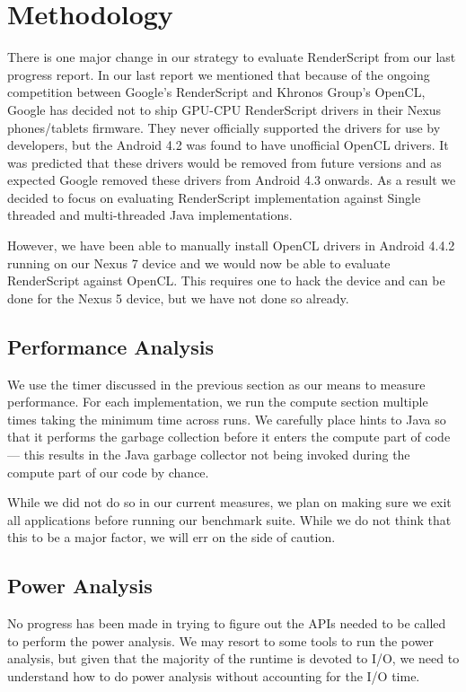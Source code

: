 \section{Methodology}

There is one major change in our strategy to evaluate RenderScript from our last
progress report. In our last report we mentioned that because of the ongoing competition between
Google's RenderScript and Khronos Group's OpenCL, Google has decided not to ship
GPU-CPU RenderScript drivers in their Nexus phones/tablets firmware. They never
officially supported the drivers for use by developers, but the Android 4.2 was
found to have unofficial OpenCL drivers. It was predicted that these drivers
would be removed from future versions and as expected Google removed these drivers from
Android 4.3 onwards. As a result we decided to focus on evaluating RenderScript
implementation against Single threaded and multi-threaded Java implementations. 

However, we have been able to manually install OpenCL drivers in Android 4.4.2
running on our Nexus 7 device and we would now be able to evaluate
RenderScript against OpenCL.
This requires one to hack the device and can be done for the Nexus 5 device, but
  we have not done so already.


\subsection{Performance Analysis}

We use the timer discussed in the previous section as our means to measure performance.
For each implementation, we run the compute section multiple times taking the 
  minimum time across runs.
We carefully place hints to Java so that it performs the garbage collection before
  it enters the compute part of code --- this results in the Java garbage collector not being invoked during the compute part of our code by chance.

While we did not do so in our current measures, we plan on making sure
   we exit all applications before running our benchmark suite.
While we do not think that this to be a major factor, we will err on the side of caution.

\subsection{Power Analysis}

No progress has been made in trying to figure out the APIs needed to be called
  to perform the power analysis.
We may resort to some tools to run the power analysis, but given that the majority
  of the runtime is devoted to I/O, we need to understand how to do power
  analysis without accounting for the I/O time.

